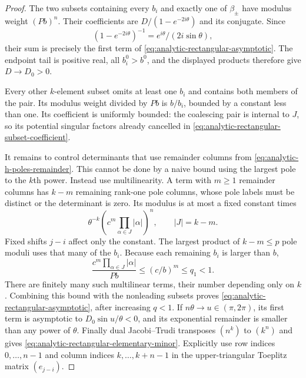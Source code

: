 \begin{proof}
The two subsets containing every $b_i$ and exactly one of
$\beta_\pm$ have modulus weight $(Pb)^n$. Their coefficients are
$D/(1-e^{-2i\theta})$ and its conjugate. Since
\[
             (1-e^{-2i\theta})^{-1}
                         =e^{i\theta}/(2i\sin\theta),
\]
their sum is precisely the first term of
\eqref{eq:analytic-rectangular-asymptotic}. The endpoint tail is
positive real, all $b_i^0>b^0$, and the displayed products therefore
give $D\to D_0>0$.

Every other $k$-element subset omits at least one $b_i$ and
contains both members of the pair. Its modulus weight divided by
$Pb$ is $b/b_i$, bounded by a constant less than one. Its coefficient
is uniformly bounded: the coalescing pair is internal to $J$, so its
potential singular factors already cancelled in
\eqref{eq:analytic-rectangular-subset-coefficient}.

It remains to control determinants that use remainder columns from
\eqref{eq:analytic-h-poles-remainder}. This cannot be done by a
naive bound using the largest pole to the $k$th power. Instead use
multilinearity. A term with $m\ge1$ remainder columns has $k-m$
remaining rank-one pole columns, whose pole labels must be distinct
or the determinant is zero. Its modulus is at most a fixed constant
 times
\[
 \theta^{-k}\left(c^m\prod_{\alpha\in J}|\alpha|\right)^n,
                              \qquad |J|=k-m.
\]
Fixed shifts $j-i$ affect only the constant. The largest product of
$k-m\le p$ pole moduli uses that many of the $b_i$. Because each
remaining $b_i$ is larger than $b$,
\[
          \frac{c^m\prod_{\alpha\in J}|\alpha|}{Pb}
                                      \le(c/b)^m\le q_1<1.
\]
There are finitely many such multilinear terms, their number depending
only on $k$. Combining this bound with the nonleading subsets proves
\eqref{eq:analytic-rectangular-asymptotic}, after increasing $q<1$.
If $n\theta\to u\in(\pi,2\pi)$, its first term is asymptotic to
$D_0\sin u/\theta<0$, and its exponential remainder is smaller than
any power of $\theta$. Finally dual Jacobi--Trudi transposes
$(n^k)$ to $(k^n)$ and gives
\eqref{eq:analytic-rectangular-elementary-minor}. Explicitly use
row indices $0,\ldots,n-1$ and column indices $k,\ldots,k+n-1$
in the upper-triangular Toeplitz matrix $(e_{j-i})$.
\end{proof}

